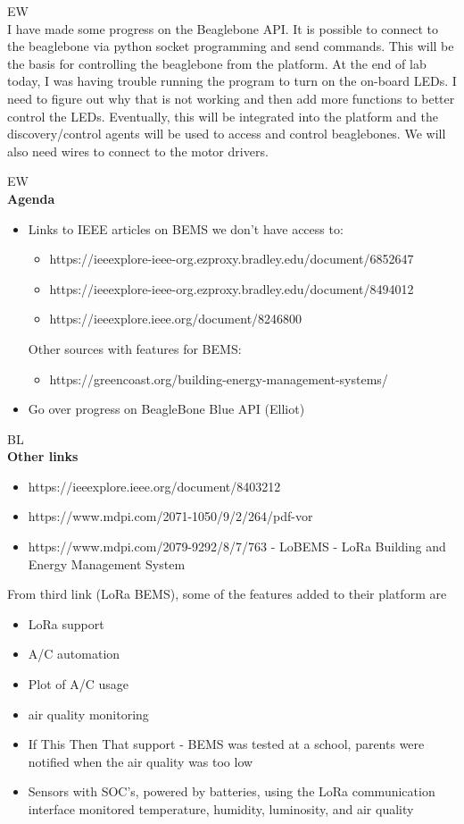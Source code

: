 \documentclass[fontsize=11pt, %
                             paper=letter, %
                             openany, %
                             captions=tableheading,
                             index=totoc,
                             hyperref]{labbook}
\begin{document}
EW\\
I have made some progress on the Beaglebone API. It is possible to connect to the beaglebone via python socket programming and send commands. This will be the basis for controlling the beaglebone from the platform. At the end of lab today, I was having trouble running the program to turn on the on-board LEDs. I need to figure out why that is not working and then add more functions to better control the LEDs. Eventually, this will be integrated into the platform and the discovery/control agents will be used to access and control beaglebones. We will also need wires to connect to the motor drivers.

EW\\
\textbf{Agenda}
\begin{itemize}
\item Links to IEEE articles on BEMS we don't have access to: 
	\begin{itemize}
	\item https://ieeexplore-ieee-org.ezproxy.bradley.edu/document/6852647
	\item https://ieeexplore-ieee-org.ezproxy.bradley.edu/document/8494012
	\item https://ieeexplore.ieee.org/document/8246800
	\end{itemize}
Other sources with features for BEMS:
	\begin{itemize}
	\item https://greencoast.org/building-energy-management-systems/
	\end{itemize}

\item Go over progress on BeagleBone Blue API (Elliot)

\end{itemize}

BL\\
\textbf{Other links}
\begin{itemize}
\item https://ieeexplore.ieee.org/document/8403212
\item https://www.mdpi.com/2071-1050/9/2/264/pdf-vor
\item https://www.mdpi.com/2079-9292/8/7/763 - LoBEMS - LoRa Building and Energy Management System	
\end{itemize}
From third link (LoRa BEMS), some of the features added to their platform are
\begin{itemize}
\item LoRa support
\item A/C automation
\item Plot of A/C usage
\item air quality monitoring
\item If This Then That support - BEMS was tested at a school, parents were notified when the air quality was too low
\item Sensors with SOC's, powered by batteries, using the LoRa communication interface monitored temperature, humidity, luminosity, and air quality
\end{itemize}
\end{document}
